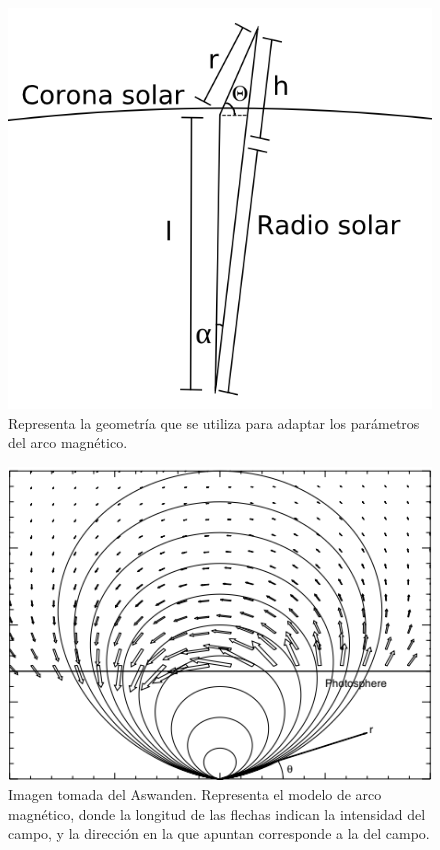 \documentclass[9pt]{book}
\begin{document}
\begin{figure}[h]
\centering
\includegraphics[scale=.8]{arco_magnetico_geometria}
\caption{ Representa la geometr\'ia que se utiliza para adaptar los par\'ametros del arco magn\'etico. }
\label{arco_geometria}
\end{figure}

\begin{figure}[h]
\centering
\includegraphics[scale=.8]{magnetic_loop}
\caption{ Imagen tomada del Aswanden. Representa el modelo de arco magn\'etico, donde la longitud de las flechas indican la intensidad del campo, y la direcci\'on en la que apuntan corresponde a la del campo. }
\label{arco_magnetico}
\end{figure}
\clearpage
\end{document}
